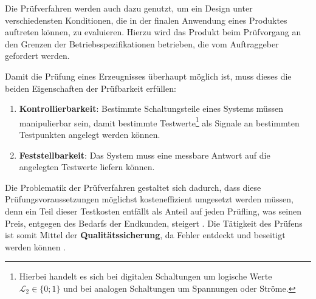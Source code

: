     Die Prüfverfahren werden auch dazu genutzt, um ein Design unter verschiedensten Konditionen, die in der finalen Anwendung eines Produktes auftreten können, zu evaluieren.
    Hierzu wird das Produkt beim Prüfvorgang an den Grenzen der Betriebsspezifikationen betrieben, die vom Auftraggeber gefordert werden. \cite{grout_integrated_2006} 

    Damit die Prüfung eines Erzeugnisses überhaupt möglich ist, muss dieses die beiden Eigenschaften der Prüfbarkeit erfüllen: \cite{grout_integrated_2006}

    \begin{enumerate}
        \item \textbf{Kontrollierbarkeit}: Bestimmte Schaltungsteile eines Systems müssen manipulierbar sein, damit bestimmte Testwerte\footnote{Hierbei handelt es sich bei digitalen Schaltungen um logische Werte $\mathcal{L}_{2} \in \{0;1\}$ und bei analogen Schaltungen um Spannungen oder Ströme.} als Signale an bestimmten Testpunkten angelegt werden können.
        \item \textbf{Feststellbarkeit}: Das System muss eine messbare Antwort auf die angelegten Testwerte liefern können.
    \end{enumerate}

    Die Problematik der Prüfverfahren gestaltet sich dadurch, dass diese Prüfungsvoraussetzungen möglichst kosteneffizient umgesetzt werden müssen, denn ein Teil dieser Testkosten entfällt als Anteil auf jeden Prüfling, was seinen Preis, entgegen des Bedarfs der Endkunden, steigert \cite{grout_integrated_2006}.
    Die Tätigkeit des Prüfens ist somit Mittel der \textbf{Qualitätssicherung}, da Fehler entdeckt und beseitigt werden können \cite{karger_pruftechnik_1985}.